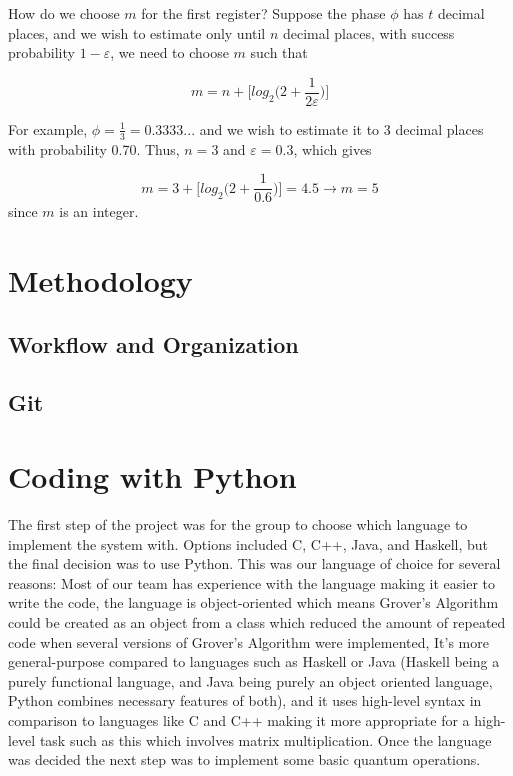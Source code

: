 \documentclass{article}
\begin{document}
\vspace{10mm} 

\noindent 
How do we choose $m$ for the first register? Suppose the phase $\phi$ has $t$ decimal places, and we wish to estimate only until $n$ decimal places, with success probability $1-\varepsilon$, we need to choose $m$ such that \cite{nielsen_quantum_2010}
\vspace{5mm}

\begin{equation}
m=n+\bigg[log_2\bigg(2+\frac{1}{2\varepsilon}\bigg)\bigg]    
\end{equation}

For example, $\phi = \frac{1}{3} = 0.3333...$ and we wish to estimate it to 3 decimal places with probability 0.70. Thus, $n=3$ and $\varepsilon = 0.3$, which gives 
\vspace{5mm}

\begin{equation}
m = 3 + \bigg[log_2\bigg(2+\frac{1}{0.6}\bigg)\bigg]=4.5 \rightarrow m=5    
\end{equation} since $m$ is an integer.


\section{Methodology}

\subsection{Workflow and Organization}

\subsection{Git}

\pagebreak

\section{Coding with Python}
The first step of the project was for the group to choose which language to implement the system with. Options included C, C++, Java, and Haskell, but the final decision was to use Python. This was our language of choice for several reasons: Most of our team has experience with the language making it easier to write the code, the language is object-oriented which means Grover’s Algorithm could be created as an object from a class which reduced the amount of repeated code when several versions of Grover's Algorithm were  implemented, It’s more general-purpose compared to languages such as Haskell or Java (Haskell being a purely functional language, and Java being purely an object oriented language, Python combines necessary features of both), and it uses high-level syntax in comparison to languages like C and C++ making it more appropriate for a high-level task such as this which involves matrix multiplication. Once the language was decided the next step was to implement some basic quantum operations.
\end{document}
